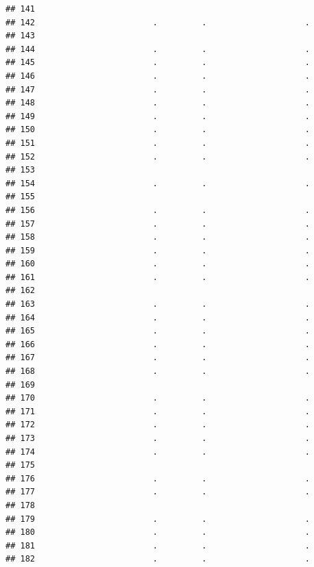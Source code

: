 \documentclass[
]{article}
\begin{document}
\begin{verbatim}
## 141                                                        
## 142                        .         .                    .
## 143                                                        
## 144                        .         .                    .
## 145                        .         .                    .
## 146                        .         .                    .
## 147                        .         .                    .
## 148                        .         .                    .
## 149                        .         .                    .
## 150                        .         .                    .
## 151                        .         .                    .
## 152                        .         .                    .
## 153                                                        
## 154                        .         .                    .
## 155                                                        
## 156                        .         .                    .
## 157                        .         .                    .
## 158                        .         .                    .
## 159                        .         .                    .
## 160                        .         .                    .
## 161                        .         .                    .
## 162                                                        
## 163                        .         .                    .
## 164                        .         .                    .
## 165                        .         .                    .
## 166                        .         .                    .
## 167                        .         .                    .
## 168                        .         .                    .
## 169                                                        
## 170                        .         .                    .
## 171                        .         .                    .
## 172                        .         .                    .
## 173                        .         .                    .
## 174                        .         .                    .
## 175                                                        
## 176                        .         .                    .
## 177                        .         .                    .
## 178                                                        
## 179                        .         .                    .
## 180                        .         .                    .
## 181                        .         .                    .
## 182                        .         .                    .

\end{verbatim}
\end{document}
